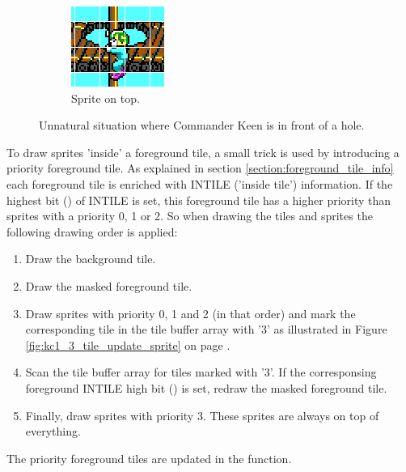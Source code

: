 \documentclass[book.tex]{subfiles}
\begin{document}
\begin{figure}[H]
\begin{subfigure}{.25\textwidth}
  \includegraphics[width=.9\textwidth]{screenshots_300dpi/game/tile_composite_3.png}
  \caption{Sprite on top.}
\end{subfigure}
\caption{Unnatural situation where Commander Keen is in front of a hole.}
\label{fig:draw_layers}
\end{figure}
\par

To draw sprites 'inside' a foreground tile, a small trick is used by introducing a priority foreground tile. As explained in section \ref{section:foreground_tile_info} each foreground tile is enriched with INTILE ('inside tile') information. If the highest bit () of INTILE is set, this foreground tile has a higher priority than sprites with a priority 0, 1 or 2. So when drawing the tiles and sprites the following drawing order is applied:
\begin{enumerate}
  \item Draw the background tile.
  \item Draw the masked foreground tile.
  \item Draw sprites with priority 0, 1 and 2 (in that order) and mark the corresponding tile in the tile buffer array with '3' as illustrated in Figure \ref{fig:kc1_3_tile_update_sprite} on page \pageref{fig:kc1_3_tile_update_sprite}.
  \item Scan the tile buffer array for tiles marked with '3'. If the corresponsing foreground INTILE high bit () is set, redraw the masked foreground tile.
  \item Finally, draw sprites with priority 3. These sprites are always on top of everything.
\end{enumerate}
\par
The priority foreground tiles are updated in the  function.\\
\end{document}
